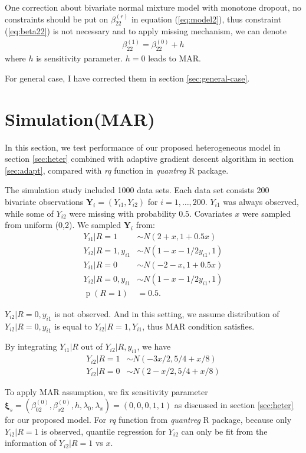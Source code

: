 \documentclass[12pt]{article}
\DeclareMathOperator{\pr}{p}
\begin{document}
One correction about bivariate normal mixture model with monotone dropout, no constraints should be put on $\beta_{22}^{(r)}$ in equation (\ref{eq:model2}), thus constraint (\ref{eq:beta22}) is not necessary and to apply missing mechanism, we can denote 
\begin{align*}
\beta_{22}^{(1)} = \beta_{22}^{(0)} + h
\end{align*}
where $h$ is sensitivity parameter.  $h = 0$ leads to MAR.

For general case, I have corrected them in section \ref{sec:general-case}.

\section{Simulation(MAR)}

In this section, we test performance of our proposed heterogeneous
model in section \ref{sec:heter} combined with adaptive gradient
descent algorithm in section \ref{sec:adapt}, compared with
\textit{rq} function in \textit{quantreg} R package.

The simulation study included 1000 data sets. Each data set consists
200 bivariate observations $\bm Y_i = (Y_{i1}, Y_{i2})$ for $i = 1,
\ldots, 200$. $Y_{i1}$ was always observed, while some of $Y_{i2}$
were missing with probability $0.5$. Covariates $x$ were sampled from
uniform (0,2). We sampled $\bm Y_i$ from:
\begin{align*}
  Y_{i1} |R = 1 & \sim N ( 2 + x, 1 + 0.5x)\\
  Y_{i2} | R = 1, y_{i1} & \sim N(1 - x - 1/2y_{i1}, 1) \\
  Y_{i1}| R= 0 & \sim N(-2 - x, 1 + 0.5x) \\
  Y_{i2}| R= 0, y_{i1} & \sim N(1 - x - 1/2y_{i1}, 1) \\
  \pr (R = 1) & = 0.5.
\end{align*}

$Y_{i2}| R = 0, y_{i1}$ is not observed. And in this setting, we
assume distribution of $Y_{i2} | R = 0, y_{i1}$ is equal to $Y_{i2}|
R= 1, Y_{i1}$, thus MAR condition satisfies.

By integrating $Y_{i1}|R$ out of $Y_{i2}|R, y_{i1}$, we have
\begin{align*}
  Y_{i2} | R = 1 & \sim N( - 3x/2, 5/4 + x/8) \\
  Y_{i2} | R = 0 & \sim N( 2 - x/2, 5/4 + x/8)
\end{align*}

To apply MAR assumption, we fix sensitivity parameter $\bm \xi_s =
(\beta_{02}^{(0)}, \beta_{x2}^{(0)}, h, \lambda_0, \lambda_x) =
(0,0,0,1,1)$ as discussed in section \ref{sec:heter} for our proposed
model. For \textit{rq} function from \textit{quantreg} R package,
because only $Y_{i2}| R = 1$ is observed, quantile regression for
$Y_{i2}$ can only be fit from the information of $Y_{i2}|R = 1$ vs
$x$.
\end{document}
